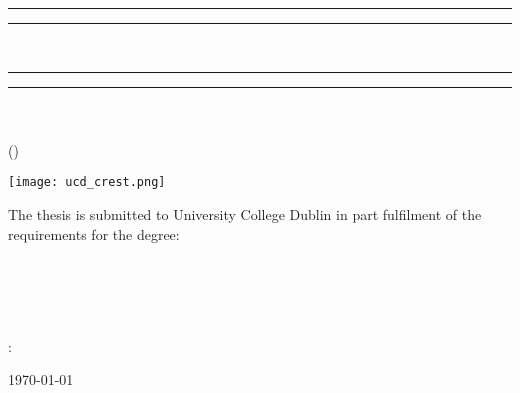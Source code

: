 \begin{titlepage}
    \begin{addmargin}[-1cm]{-1cm}
    \begin{center}
        \large

        \hfill

        \vfill
        \rule{\textwidth}{1.6pt}\vspace*{-\baselineskip}\vspace*{2pt} %
        \rule{\textwidth}{0.4pt}\\ %
        \vspace{0.75\baselineskip} %
        \begin{center}
        \begingroup
           \Large\color{CTtitle}\spacedallcaps{\myTitle} %
        \endgroup
        \end{center}
        \vspace{0.1\baselineskip} %
        \rule{\textwidth}{0.4pt}\vspace*{-\baselineskip}\vspace{3.2pt} %
	    \rule{\textwidth}{1.6pt} %
	
	    \vspace{2\baselineskip} %
        \begingroup
        \spacedlowsmallcaps{\mySubtitle}\\
        \endgroup
        \vspace*{3\baselineskip} %
        \large{\spacedlowsmallcaps{\myName}}\\
        (\myStdNumber)

        \vfill

        \texttt{[image: ucd\_crest.png]} \\ \medskip

        The thesis is submitted to University College Dublin in part fulfilment of the requirements for the degree:\\\medskip
        \myDegree \\
        \myDepartment \\
        \myFaculty \\
        \myUni \\ \bigskip

        \noindent{}: \myProf \\
        \medskip

        \today%

        \vfill

    \end{center}
  \end{addmargin}
\end{titlepage}
